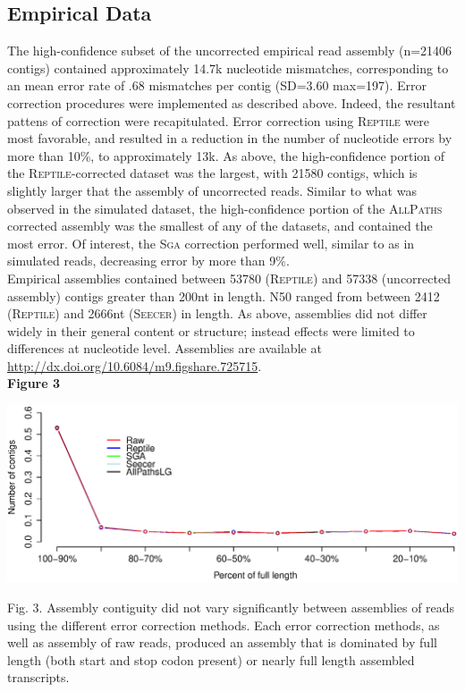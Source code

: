 \documentclass[11pt]{article}
\begin{document}
\subsection*{Empirical Data} 
The high-confidence subset of the uncorrected empirical read assembly (n=21406 contigs) contained approximately 14.7k nucleotide mismatches, corresponding to an mean error rate of .68 mismatches per contig (SD=3.60 max=197).  Error correction procedures were implemented as described above. Indeed, the resultant pattens of correction were recapitulated. Error correction using \textsc{Reptile} were most favorable, and resulted in a reduction in the number of nucleotide errors by more than 10\%, to approximately 13k.  As above, the high-confidence portion of the \textsc{Reptile}-corrected dataset was the largest, with 21580 contigs, which is slightly larger that the assembly of uncorrected reads. Similar to what was observed in the simulated dataset, the high-confidence portion of the \textsc{AllPaths} corrected assembly was the smallest of any of the datasets, and contained the most error. Of interest, the \textsc{Sga} correction performed well, similar to as in simulated reads, decreasing error by more than 9\%. \\

\noindent
Empirical assemblies contained between 53780 (\textsc{Reptile}) and 57338 (uncorrected assembly) contigs greater than 200nt in length.  N50 ranged from between 2412 (\textsc{Reptile}) and 2666nt (\textsc{Seecer}) in length.  As above, assemblies did not differ widely in their general content or structure; instead effects were limited to differences at nucleotide level. Assemblies are available at \url{http://dx.doi.org/10.6084/m9.figshare.725715}. \\

\textbf{\hypertarget{Figure 3}{Figure 3}} \\
\centerline{\includegraphics[width=20.0\baselineskip]{newFig4.eps}}

\noindent
\begin{changemargin}{2cm}{2cm}
Fig. 3. Assembly contiguity did not vary significantly between assemblies of reads using the different error correction methods. Each error correction methods, as well as assembly of raw reads, produced an assembly that is dominated by full length (both start and stop codon present) or nearly full length assembled transcripts. 
\end{changemargin}
\vspace{10mm}
\end{document}

